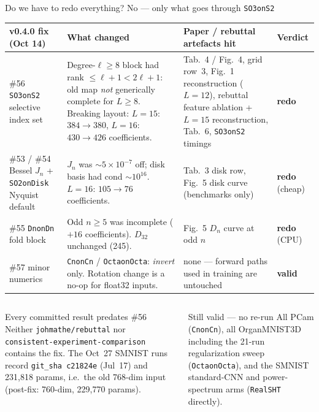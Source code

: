 \documentclass[aspectratio=169,10pt]{beamer}
\newcommand{\redo}{\textcolor{bsp}{\textbf{redo}}}
\newcommand{\valid}{\textcolor{okgreen}{\textbf{valid}}}
\newcommand{\code}[1]{\texttt{#1}}
\begin{document}
\begin{frame}{Do we have to redo everything? No --- only what goes through \texttt{SO3onS2}}
\scriptsize
\renewcommand{\arraystretch}{1.25}
\begin{tabularx}{\textwidth}{@{}L{2.7cm} Y Y L{1.2cm}@{}}
\toprule
\textbf{v0.4.0 fix (Oct 14)} & \textbf{What changed} & \textbf{Paper / rebuttal artefacts hit} & \textbf{Verdict} \\
\midrule
\#56 \code{SO3onS2} selective index set
  & Degree-$\ell\ge 8$ block had rank $\le \ell{+}1 < 2\ell{+}1$: old map \emph{not} generically complete for $L\ge 8$. Breaking layout: $L{=}15$: $384\to380$, $L{=}16$: $430\to426$ coefficients.
  & Tab.~4 / Fig.~4, grid row~3, Fig.~1 reconstruction ($L{=}12$), rebuttal feature ablation + $L{=}15$ reconstruction, Tab.~6, \code{SO3onS2} timings
  & \redo \\
\#53 / \#54 Bessel $J_n$ + \code{SO2onDisk} Nyquist default
  & $J_n$ was ${\sim}5{\times}10^{-7}$ off; disk basis had cond ${\sim}10^{16}$. $L{=}16$: $105\to76$ coefficients.
  & Tab.~3 disk row, Fig.~5 disk curve (benchmarks only)
  & \redo{} \textcolor{muted}{(cheap)} \\
\#55 \code{DnonDn} fold block
  & Odd $n\ge5$ was incomplete ($+16$ coefficients). $D_{32}$ unchanged (245).
  & Fig.~5 $D_n$ curve at odd $n$
  & \redo{} \textcolor{muted}{(CPU)} \\
\#57 minor numerics
  & \code{CnonCn} / \code{OctaonOcta}: \emph{invert} only. Rotation change is a no-op for float32 inputs.
  & none --- forward paths used in training are untouched
  & \valid \\
\bottomrule
\end{tabularx}

\vspace{0.7em}
\begin{columns}[T]
\begin{column}{0.49\textwidth}
\begin{block}{\footnotesize Every committed result predates \#56}
\scriptsize
Neither \code{johmathe/rebuttal} nor \code{consistent-experiment-comparison} contains the fix. The Oct~27 SMNIST runs record \code{git\_sha c21824e} (Jul~17) and 231{,}818 params, i.e.\ the old 768-dim input (post-fix: 760-dim, 229{,}770 params).
\end{block}
\end{column}
\begin{column}{0.49\textwidth}
\begin{block}{\footnotesize Still valid --- no re-run}
\scriptsize
All PCam (\code{CnonCn}), all OrganMNIST3D including the 21-run regularization sweep (\code{OctaonOcta}), and the SMNIST standard-CNN and power-spectrum arms (\code{RealSHT} directly).
\end{block}
\end{column}
\end{columns}
\end{frame}
\end{document}
